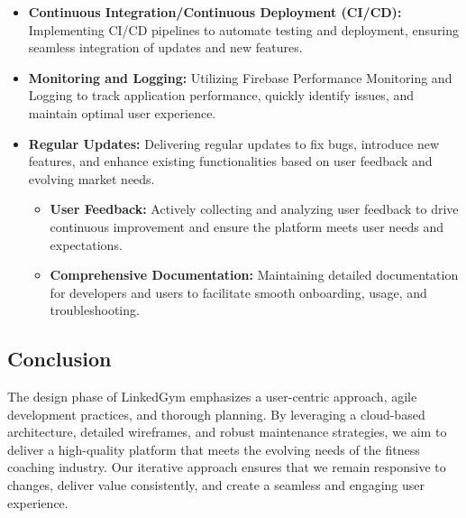 \begin{itemize}
  \item \textbf{Continuous Integration/Continuous Deployment (CI/CD):} Implementing CI/CD pipelines to automate testing and deployment, ensuring seamless integration of updates and new features.
  
  \item \textbf{Monitoring and Logging:} Utilizing Firebase Performance Monitoring and Logging to track application performance, quickly identify issues, and maintain optimal user experience.
  
  \item \textbf{Regular Updates:} Delivering regular updates to fix bugs, introduce new features, and enhance existing functionalities based on user feedback and evolving market needs.

\begin{itemize}
\item \textbf{User Feedback:} Actively collecting and analyzing user feedback to drive continuous improvement and ensure the platform meets user needs and expectations.

\item \textbf{Comprehensive Documentation:} Maintaining detailed documentation for developers and users to facilitate smooth onboarding, usage, and troubleshooting.
\end{itemize}
\end{itemize}


\subsection{Conclusion}
The design phase of LinkedGym emphasizes a user-centric approach, agile development practices, and thorough planning. By leveraging a cloud-based architecture, detailed wireframes, and robust maintenance strategies, we aim to deliver a high-quality platform that meets the evolving needs of the fitness coaching industry. Our iterative approach ensures that we remain responsive to changes, deliver value consistently, and create a seamless and engaging user experience.
